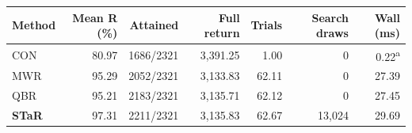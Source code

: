 \begingroup
\small
\setlength{\tabcolsep}{4pt}
\renewcommand{\arraystretch}{1.12}
\noindent
\begin{tabular}{@{}lrrrrrr@{}}
\toprule
\textbf{Method} & \textbf{Mean R (\%)} & \textbf{Attained} & \textbf{Full return} & \textbf{Trials} & \textbf{Search draws} & \textbf{Wall (ms)} \\
\midrule
CON & 80.97 & 1686/2321 & 3,391.25 & 1.00 & 0 & 0.22\textsuperscript{a} \\
MWR & 95.29 & 2052/2321 & 3,133.83 & 62.11 & 0 & 27.39 \\
QBR & 95.21 & 2183/2321 & 3,135.71 & 62.12 & 0 & 27.45 \\
\addlinespace[2pt]
\textbf{STaR} & 97.31 & 2211/2321 & 3,135.83 & 62.67 & 13,024 & 29.69 \\
\bottomrule
\end{tabular}
\endgroup
